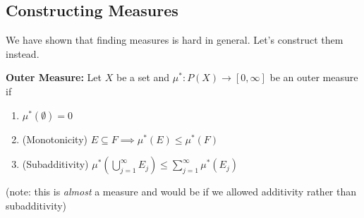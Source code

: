 \documentclass[12pt]{report}
\newcommand{\sub}{\subseteq}
\begin{document}
    \subsection*{Constructing Measures}
        We have shown that finding measures is hard in general. Let's construct them instead. 

        \textbf{Outer Measure:} Let $X$ be a set and $\mu^*: P(X) \to [0, \infty]$ be an outer measure if
        \begin{enumerate}
            \item $\mu^*(\emptyset) = 0$
            \item (Monotonicity) $E \sub F \implies \mu^*(E) \leq \mu^*(F)$
            \item (Subadditivity) $\mu^*\left(\bigcup_{j=1}^{\infty} E_j\right) \leq \sum_{j=1}^{\infty} \mu^*(E_j)$
        \end{enumerate}
        (note: this is \emph{almost} a measure and would be if we allowed additivity rather than subadditivity)
\end{document}
